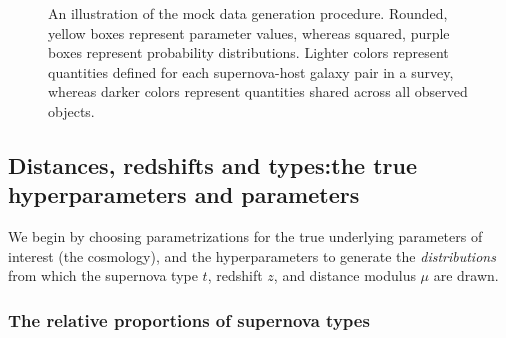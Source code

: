 \documentclass[12pt, twocolumn]{emulateapj}
\begin{document}
\begin{figure}
\begin{center}
\begin{tikzpicture}[node distance=1cm]
\end{tikzpicture}
\caption{An illustration of the mock data generation procedure.  
Rounded, yellow boxes represent parameter values, whereas squared, purple boxes represent probability distributions.  
Lighter colors represent quantities defined for each supernova-host galaxy pair in a survey, whereas darker colors represent quantities shared across all observed objects.}
\label{fig:simflow}
\end{center}
\end{figure}

 \subsection{Distances, redshifts and types:the true hyperparameters and parameters}
\label{sec:true_hypers}

We begin by choosing parametrizations for the true underlying parameters of interest (the cosmology), and the hyperparameters to generate the \textit{distributions} from which the supernova type $t$, redshift $z$, and distance modulus $\mu$ are drawn.

% 
\subsubsection{The relative proportions of supernova types}
\label{sec:sntypes}
\end{document}
